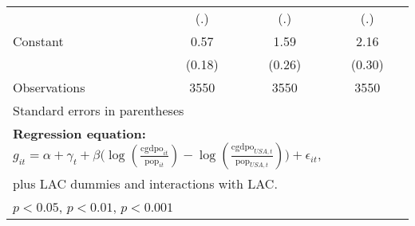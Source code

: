 \begin{table}[htbp]
\begin{tabular}{l*{3}{c}}
                &      (.)         &      (.)         &      (.)         \\
\addlinespace
Constant        &     0.57\sym{**} &     1.59\sym{***}&     2.16\sym{***}\\
                &   (0.18)         &   (0.26)         &   (0.30)         \\
\midrule
Observations    &     3550         &     3550         &     3550         \\
\bottomrule
\multicolumn{4}{l}{\footnotesize Standard errors in parentheses}\\
\multicolumn{4}{l}{\footnotesize \textbf{Regression equation:} \(g_{it} = \alpha + \gamma_t + \beta \big(\log (\frac{\textrm{cgdpo}_{it}}{\textrm{pop}_{it}} ) - \log (\frac{\textrm{cgdpo}_{USA,t}}{\textrm{pop}_{USA,t}}  ) \big) + \epsilon_{it}\), }\\
\multicolumn{4}{l}{\footnotesize plus LAC dummies and interactions with LAC.}\\
\multicolumn{4}{l}{\footnotesize \sym{*} \(p<0.05\), \sym{**} \(p<0.01\), \sym{***} \(p<0.001\)}\\
\end{tabular}
\end{table}
